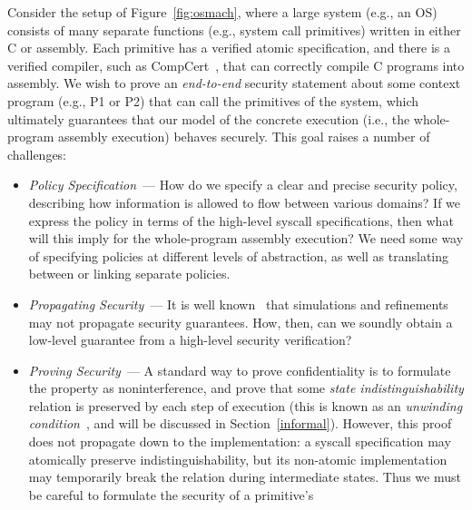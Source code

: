 Consider the setup of 
Figure~\ref{fig:osmach}, where a large system (e.g., an OS)
consists of many separate functions (e.g., system call primitives) 
written in either C or assembly. Each primitive has a verified
atomic specification, and there is a verified compiler, such as 
CompCert~\cite{compcert}, that can correctly compile C
programs into assembly. We wish to prove an \emph{end-to-end}
security statement about some context program (e.g., P1 or P2) that can call 
the primitives of the system, which ultimately guarantees that 
our model of the concrete execution (i.e., the whole-program assembly 
execution) behaves securely. This goal raises a number of 
challenges:
\begin{itemize}
\item \emph{Policy Specification}~--- How do we specify a clear
and precise security policy, describing how information is
allowed to flow between various domains? If we express the
policy in terms of the high-level syscall specifications, 
then what will this imply for the whole-program assembly execution? 
We need some way of specifying policies at different levels of 
abstraction, as well as translating between or linking separate 
policies.
\item \emph{Propagating Security}~--- It is well 
known~\cite{jurjens,morgan09} that
simulations and refinements may not propagate security guarantees.
How, then, can we soundly obtain a low-level guarantee from a 
high-level security verification?
\item \emph{Proving Security}~--- A standard way to prove
confidentiality is to formulate the property as noninterference,
and prove that some \emph{state indistinguishability} relation is
preserved by each step of execution (this is known as 
an \emph{unwinding condition}~\cite{goguen82,goguen84},
and will be discussed in Section~\ref{informal}). 
However, this proof does not propagate down to the 
implementation: a syscall specification may atomically preserve
indistinguishability, but its non-atomic implementation may 
temporarily break the relation during intermediate states. Thus we
must be careful to formulate the security of a primitive's 

\end{itemize}
